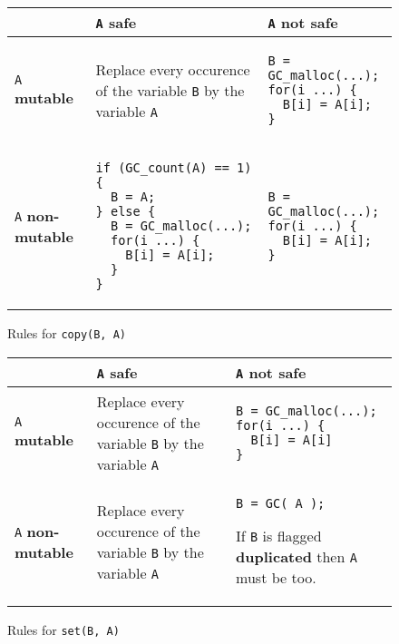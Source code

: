 \documentclass[12pt,a4paper]{article}
\newcommand{\cl}[1]{\texttt{#1}}
\newcommand{\mut}{  \textbf{ mutable } }
\newcommand{\nmut}{ \textbf{ non-mutable } }
\newcommand{\safe}{ \textbf{ safe } }
\newcommand{\dupl}{ \textbf{ duplicated } }
\begin{document}
\begin{figure}[!ht]
\begin{tabular}{|p{5.5cm}|p{5.5cm}|p{6cm}|}
\hline
             & \cl{A} \safe & \cl{A} not \safe \\ \hline
\cl{A} \mut  & Replace every occurence of the variable \cl{B} by the variable \cl{A} & \begin{lstlisting}
B = GC_malloc(...);
for(i ...) {
  B[i] = A[i];
}
\end{lstlisting} \\ \hline
\cl{A} \nmut & \begin{lstlisting}
if (GC_count(A) == 1) {
  B = A;
} else {
  B = GC_malloc(...);
  for(i ...) {
    B[i] = A[i];
  }
}
\end{lstlisting} & \begin{lstlisting}
B = GC_malloc(...);
for(i ...) {
  B[i] = A[i];
}
\end{lstlisting} \\ \hline
\end{tabular}
\caption{Rules for \cl{copy(B, A)}}
\end{figure}



\begin{figure}[!ht]
\begin{tabular}{|p{5.5cm}|p{5.5cm}|p{6cm}|}
\hline
             & \cl{A} \safe & \cl{A} not \safe \\ \hline
\cl{A} \mut  & Replace every occurence of the variable \cl{B} by the variable \cl{A} & \begin{lstlisting}
B = GC_malloc(...);
for(i ...) {
  B[i] = A[i]
}
\end{lstlisting} \\ \hline
\cl{A} \nmut & Replace every occurence of the variable \cl{B} by the variable \cl{A} & \begin{lstlisting}
B = GC( A );
\end{lstlisting}
If \cl{B} is flagged \dupl then \cl{A} must be too.
\\ \hline
\end{tabular}
\caption{Rules for \cl{set(B, A)}}
\end{figure}
\end{document}
